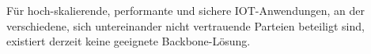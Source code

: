 \documentclass[
    ngerman,american
    ]{scrartcl}
\newcommand{\lang}{de}
\begin{document}
\begin{description}[style=unboxed]
	\item [\questionOne{\lang}]

	Für hoch-skalierende, performante und sichere IOT-Anwendungen, an der verschiedene, sich untereinander nicht vertrauende Parteien beteiligt sind, existiert derzeit keine geeignete Backbone-Lösung.


\end{description}
\end{document}
